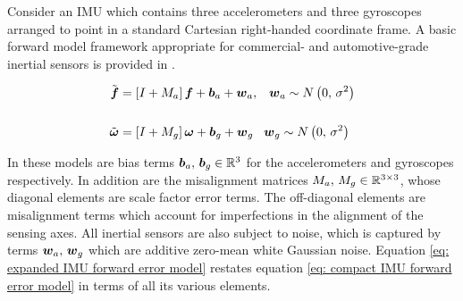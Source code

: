 Consider an IMU which contains three accelerometers and three gyroscopes arranged to point in a standard Cartesian right-handed coordinate frame. A basic forward model framework appropriate for commercial- and automotive-grade inertial sensors is provided in \cite{groves2013principles}. 

\begin{align} \label{eq: compact IMU forward error model}
	\tilde{\boldsymbol{f}} &= \left[I + M_a\right] \boldsymbol{f} + \boldsymbol{b}_a + \boldsymbol{w}_a, \,\,\,\,\, \boldsymbol{w}_a \sim N\left(0,\,\sigma^2\right) \notag\\
	\\
	\tilde{\boldsymbol{\omega}} &= \left[I + M_g\right] \boldsymbol{\omega} + \boldsymbol{b}_g + \boldsymbol{w}_g \,\,\,\,\, \boldsymbol{w}_g \sim N\left(0,\,\sigma^2\right) \notag
\end{align}

In these models are bias terms $\boldsymbol{b}_a, \, \boldsymbol{b}_g \in \mathbb{R}^3$ for the accelerometers and gyroscopes respectively. In addition are the misalignment matrices $M_a, \, M_g \in \mathbb{R}^{3 \times 3}$, whose diagonal elements are scale factor error terms. The off-diagonal elements are misalignment terms which account for imperfections in the alignment of the sensing axes. All inertial sensors are also subject to noise, which is captured by terms $\boldsymbol{w}_a,\,\boldsymbol{w}_g$ which are additive zero-mean white Gaussian noise. Equation \ref{eq: expanded IMU forward error model} restates equation \ref{eq: compact IMU forward error model} in terms of all its various elements.

